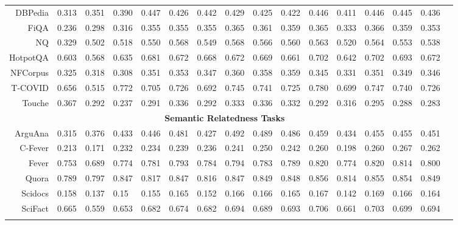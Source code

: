\begin{table*}[h]
{\begin{tabular}{r r r lr  |lllll|llllll}
\comments{
              \multicolumn{15}{c}{\bf{Search Tasks}}\\
               \hline
                {DBPedia}	& 0.313	& 0.351 &  0.390&0.447	& 0.426 &0.442& 0.429 & 0.425 & 0.422 & 0.446 & 0.411 & 0.446 & 0.445&0.436 \\
                                {FiQA} &	0.236	& 0.298 &  0.316&0.355 & 0.355 &0.355 &0.365 & 0.361 &0.359 & 0.365 & 0.333 & 0.366 & 0.359& 0.353\\
                {NQ}	& 0.329   & 0.502  &	 0.518&0.550 & 0.568 &0.549&0.568 & 0.566 & 0.560 & 0.563 & 0.520 & 0.564 & 0.553& 0.538\\
                {HotpotQA} & 0.603 & 0.568 &  0.635& {0.681} & 0.672 &0.668&  0.672 & 0.669 & 0.661 & 0.702 & 0.642 & 0.702 & 0.693&0.672 \\
                {NFCorpus}  & 0.325 & 0.318  &  0.308&0.351 & 0.353 &0.347&  0.360 & 0.358 & 0.359 & 0.345 &0.331 & 0.351 & 0.349& 0.346 \\
                {T-COVID}	& 0.656 & 0.515  &  0.772&0.705 & 0.726 &0.692&  0.745 & 0.741 & 0.725 & 0.780 & 0.699 &0.747 &0.740& 0.726\\
                {Touche}	& {0.367}  & 0.292  &  0.237&0.291 & 0.336 &0.292 &0.333 & 0.336 & 0.332 & 0.292 &0.316 & 0.295 &0.288& 0.283\\
                \hline
                \multicolumn{15}{c}{\bf{Semantic Relatedness Tasks}}\\
                 \hline
                {ArguAna} & 0.315 & 0.376  &  0.433&0.446 & 0.481 &0.427&  0.492 & 0.489 & 0.486 & 0.459 & 0.434 & 0.455 &0.455 & 0.451\\
                {C-Fever}	& 0.213 & 0.171  &  0.232&0.234 & {0.239} &0.236&  0.241 & 0.250 & 0.242 & 0.260 &0.198 &0.260 &0.267& 0.262\\
                {Fever} & 0.753  &0.689  &	 0.774& {0.781} & 0.793 &0.784&  0.794 & 0.783 & 0.789 & 0.820 &0.774 &0.820 &0.814& 0.800\\
                {Quora} & 0.789 & 0.797  &	 0.847&0.817 &	0.847 &0.816&  0.847 & 0.849 &0.848 & 0.856 &0.814 &0.855 &0.854& 0.849\\
                {Scidocs}	& 0.158 &0.137  &	 0.15&0.155 &	{0.165} &0.152&  0.166 & 0.166 & 0.165 & 0.167 &0.142 &0.169&0.166& 0.164\\
                {SciFact}	& 0.665 & 0.559  &  0.653& {0.682} & 0.674 &0.682&  0.694 & 0.689 & 0.693 & 0.706  &0.661 &0.703 &0.699& 0.694\\
}
                            \hline

\end{tabular}}
\end{table*}
